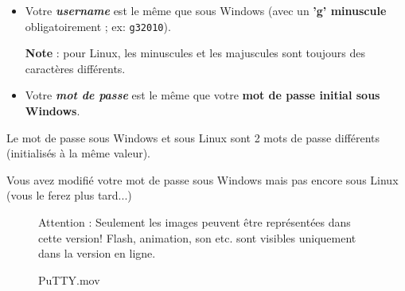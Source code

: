 \documentclass[a4paper,11pt]{article}
\begin{document}
 \par
        
\begin{itemize}
				
\item Votre \textbf{\textit{username}} est le m\^eme que sous Windows (avec un \textbf{'g' minuscule} obligatoirement ; ex:	\verb_g32010_).
\par
\textbf{Note} : pour Linux, les minuscules et les majuscules sont toujours des caract\`eres diff\'erents.
					
\item Votre \textit{\textbf{mot de passe}} est le m\^eme que votre \textbf{mot de passe initial sous Windows}.
					
\end{itemize}
				
Le mot de passe sous Windows et sous Linux sont 2 mots de passe diff\'erents (initialis\'es \`a la m\^eme valeur).
        
\par
        
Vous avez modifi\'e votre mot de passe sous Windows mais pas encore sous Linux (vous le ferez plus tard...)
				
\par
\begin{figure}[hbt]      
 \begin{coltbox}{Attention :}
Seulement les images peuvent \^etre repr\'esent\'ees dans cette version! Flash, animation, son etc. sont visibles uniquement dans la version en ligne.
\end{coltbox}
\caption[PuTTY.mov]{PuTTY.mov}
\end{figure}
\end{document}
